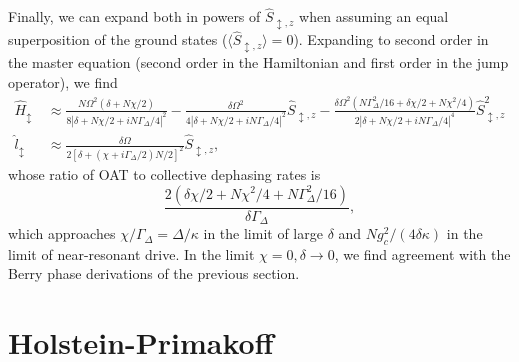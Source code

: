 Finally, we can expand both in powers of $\hat S_{\updownarrow,z}$ when assuming an equal superposition of the ground states ($\langle \hat S_{\updownarrow,z} \rangle = 0$). Expanding to second order in the master equation (second order in the Hamiltonian and first order in the jump operator), we find
\begin{subequations}
    \begin{align}
        \hat H_{\updownarrow} &~ \approx \frac{N \Omega^2 (\delta + N \chi/2) }{8| \delta + N \chi/2 + i N \Gamma_\Delta/4|^2} - \frac{ \delta \Omega^2 }{4 | \delta + N \chi/2 + i N \Gamma_\Delta/4|^2} \hat S_{\updownarrow,z} - \frac{ \delta \Omega^2 (N \Gamma_\Delta^2/16 +  \delta \chi/2 + N \chi^2/4) }{2 |\delta + N \chi/2 + i N \Gamma_\Delta /4|^4} \hat S_{\updownarrow,z}^2 \\
        \hat l_{\updownarrow} &~ \approx  \frac{\delta \Omega }{2[ \delta + (\chi + i \Gamma_\Delta/2) N/2]^2}\hat S_{\updownarrow,z},
    \end{align}
\end{subequations}
whose ratio of OAT to collective dephasing rates is
\begin{equation}
    \frac{2 (\delta \chi/2 + N \chi^2/4 + N\Gamma_\Delta^2/16)}{\delta \Gamma_\Delta},
\end{equation}
which approaches $\chi/\Gamma_\Delta = \Delta/\kappa$ in the limit of large $\delta$ and $N g_c^2 /(4 \delta \kappa)$ in the limit of near-resonant drive. In the limit $\chi = 0, \delta \to 0$, we find agreement with the Berry phase derivations of the previous section.

\section{Holstein-Primakoff}
\label{sec:HP}

